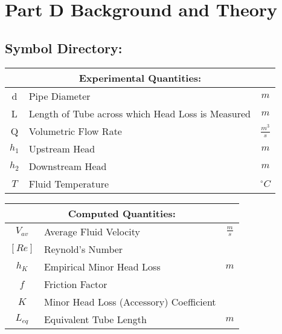 \documentclass[12pt]{article}
\begin{document}
	\section{Part D Background and Theory}
	\hfill\break\break
	\subsection{Symbol Directory:}
	{
	\centering
	\begin{tabular}{|c|l|c|}
		\hline
		\multicolumn{3}{|c|}{\textbf{Experimental Quantities:}} \\
		\hline
		\hline
		d & Pipe Diameter & $m$\\
		L & Length of Tube across which Head Loss is Measured & $m$ \\
		Q & Volumetric Flow Rate & $\frac{m^3}{s}$\\
		$h_1$ & Upstream Head & $m$ \\
		$h_2$ & Downstream Head & $m$ \\
		$T$ & Fluid Temperature & $^{\circ}C$ \\
		\hline
	\end{tabular}
	}
	\hfill\break\break\break
	{
	\centering
	\begin{tabular}{|c|l|c|}
		\hline
		\multicolumn{3}{|c|}{\textbf{Computed Quantities:}} \\
		\hline
		\hline
		$V_{av}$ & Average Fluid Velocity & $\frac{m}{s}$\\
		$[Re]$ & Reynold's Number & ${}$ \\
		$h_K$ & Empirical Minor Head Loss & $m$\\
		$f$ & Friction Factor & ${}$\\
		$K$ & Minor Head Loss (Accessory) Coefficient & ${}$\\
		$L_{eq}$ & Equivalent Tube Length & $m$\\
		\hline
	\end{tabular}
	}
\end{document}
